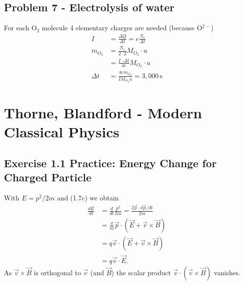 \documentclass[10pt,a4paper]{book}
\theoremstyle{definition}
\begin{document}
\subsection{Problem 7 - Electrolysis of water}
For each O$_2$ molecule 4 elementary charges are needed (because O$^{2-}$)
\begin{align}
I&=\frac{\Delta Q}{\Delta t}=e\frac{N_e}{\Delta t}\\
m_{O_2}
&=\frac{N_e}{2\cdot 2}M_{O_2}\cdot u\\
&=\frac{I\cdot\Delta t}{4e}M_{O_2}\cdot u\\
\Delta t&=\frac{4em_{O_2}}{IM_{O_2}u}=3,000\,\text{s}
\end{align}





\section{{\sc Thorne, Blandford} - Modern Classical Physics}
\subsection{Exercise 1.1 Practice: Energy Change for Charged Particle}
With $E=p^2/2m$ and (1.7c) we obtain
\begin{align}
    \frac{dE}{dt}&=\frac{d}{dt}\frac{p^2}{2m}=\frac{2 \vec{p}\cdot d\vec{p}/dt}{2m}\\
    &=\frac{q}{m}\vec{p}\cdot (\vec{E}+\vec{v}\times\vec{B})\\
    &=q\vec{v}\cdot (\vec{E}+\vec{v}\times\vec{B})\\
    &=q\vec{v}\cdot\vec{E}.
\end{align}
As $\vec{v}\times\vec{B}$ is orthogonal to $\vec{v}$ (and $\vec{B}$) the scalar product $\vec{v}\cdot(\vec{v}\times\vec{B})$ vanishes.
\end{document}
